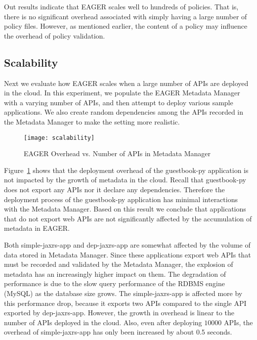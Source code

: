 Out results indicate that EAGER scales well to hundreds of policies. That is,
there is no significant overhead associated with simply having a large number
of policy files. However, as mentioned earlier, the content of a policy may
influence the overhead of policy validation.
 
\subsection{Scalability}
Next we evaluate how EAGER scales when a large number of APIs are deployed in the cloud. In this experiment, we populate the EAGER
Metadata Manager with a varying number of APIs, and then attempt to deploy various sample applications. We also create
random dependencies among the APIs recorded in the Metadata Manager to make the setting more realistic.

\begin{figure}
\centering
\texttt{[image: scalability]}
\vspace{-0.01in}
\caption{EAGER Overhead vs. Number of APIs in Metadata Manager}
\label{fig:scalability}
\end{figure}

Figure~\ref{fig:scalability} shows that the deployment overhead of the guestbook-py application is not impacted by the growth of metadata
in the cloud. Recall that guestbook-py does not export any APIs nor it declare any dependencies. Therefore the deployment process of
the guestbook-py application has minimal interactions with the Metadata Manager. Based on this result we conclude that applications that
do not export web APIs are not significantly affected by the accumulation of metadata in EAGER.

Both simple-jaxrs-app and dep-jaxrs-app are
somewhat affected by the volume of data stored in Metadata Manager. Since these applications export web APIs that must be 
recorded and validated by the Metadata Manager, the explosion of metadata has an increasingly higher impact on them. The degradation 
of performance is due to the slow query performance of the RDBMS engine (MySQL) as the database size grows. The simple-jaxrs-app
is affected more by this performance drop, because it exports two APIs compared to the single API exported 
by dep-jaxrs-app. However, the growth
in overhead is linear to the number of APIs deployed in the cloud. Also,
even after deploying $10000$ APIs, the overhead of simple-jaxrs-app has only been increased by about 0.5 seconds.

